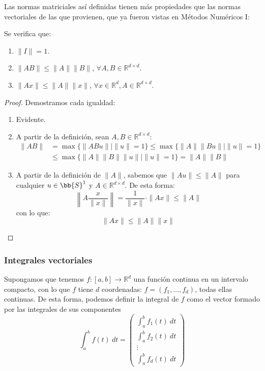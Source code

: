 \noindent
Las normas matriciales así definidas tienen más propiedades que las normas vectoriales de las que provienen, que ya fueron vistas en Métodos Numéricos I\@:
\begin{prop}
    Se verifica que:
    \begin{enumerate}
        \item $\|I\| = 1$.
        \item $\|AB\| \leq \|A\|\|B\|$, $\forall A,B\in \mathbb{R}^{d\times d}$.
        \item $\|Ax\| \leq \|A\|\|x\|$, $\forall x\in \mathbb{R}^d, A\in \mathbb{R}^{d\times d}$.
    \end{enumerate}
    \begin{proof}
        Demostramos cada igualdad:
        \begin{enumerate}
            \item Evidente.
            \item A partir de la definición, sean $A,B\in \mathbb{R}^{d\times d}$:
                \begin{align*}
                    \|AB\| &= \max\{\|ABu\| \mid \|u\| = 1\} \leq \max\{\|A\|\|Bu\| \mid \|u\| = 1\} \\
                        &\leq \max\{\|A\|\|B\|\|u\| \mid \|u\| = 1\} = \|A\|\|B\|
                \end{align*}
            \item A partir de la definición de $\|A\|$, sabemos que $\|Au\| \leq \|A\|$ para cualquier $u\in \bb{S}^1$ y $A\in \mathbb{R}^{d\times d}$. De esta forma:
                \begin{equation*}
                    \left\|A \dfrac{x}{\|x\|}\right\| = \dfrac{1}{\|x\|} \cdot \|Ax\| \leq \|A\|
                \end{equation*}
                con lo que:
                \begin{equation*}
                    \|Ax\| \leq \|A\|\|x\|
                \end{equation*}
        \end{enumerate}
    \end{proof}
\end{prop}

\subsubsection{Integrales vectoriales}
Supongamos que tenemos $f:[a,b]\rightarrow \mathbb{R}^d$ una función continua en un intervalo compacto, con lo que $f$ tiene $d$ coordenadas: $f=(f_1,\ldots,f_d)$, todas ellas continuas. De esta forma, podemos definir la integral de $f$ como el vector formado por las integrales de sus componentes
\begin{equation*}
    \int_{a}^{b} f(t)~dt  = \left(\begin{array}{c}
        \displaystyle\int_{a}^{b} f_1(t)~dt  \\
        \displaystyle\int_{a}^{b} f_2(t)~dt  \\
        \vdots \\
        \displaystyle\int_{a}^{b} f_d(t)~dt  
    \end{array}\right)
\end{equation*}

